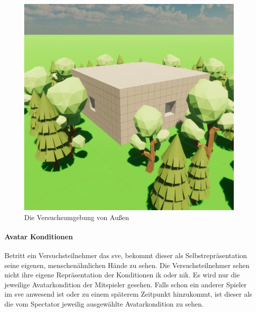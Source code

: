 \documentclass[a4paper,11pt]{article}%
\renewcommand{\\}{\vspace*{0.5\baselineskip} \newline}
\begin{document}
\begin{figure}[H]
		\begin{footnotesize}
		\centering
			\includegraphics[scale=0.4]{Abbildungen/Versuchsumgebung/Raum.JPG}
			
			\caption[Abbildung 1]{Die Versuchsumgebung von Außen}
			\label{Versuchsumgebung}
		\end{footnotesize}
	\end{figure}

\paragraph{Avatar Konditionen}
Betritt ein Versuchsteilnehmer das \ac{sve}, bekommt dieser als Selbstrepräsentation seine eigenen, menschenähnlichen Hände zu sehen. Die Versuchsteilnehmer sehen nicht ihre eigene Repräsentation der Konditionen \ac{ik} oder \ac{nik}. Es wird nur die jeweilige Avatarkondition der Mitspieler gesehen.
Falls schon ein anderer Spieler im \ac{sve} anwesend ist oder zu einem späterem Zeitpunkt hinzukommt, ist dieser als die vom Spectator jeweilig ausgewählte Avatarkondition zu sehen. 
\end{document}
